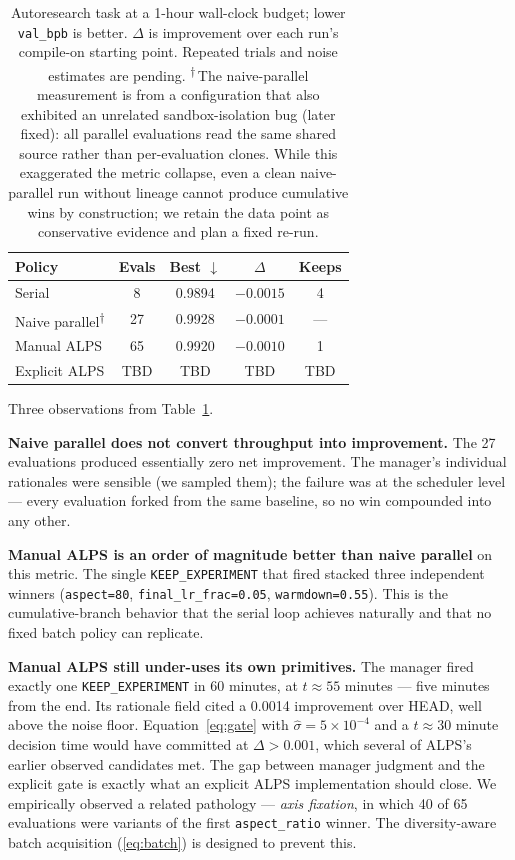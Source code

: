 \documentclass{article}
\newcommand{\alps}{ALPS\xspace}
\newcommand{\keep}{\texttt{KEEP\_EXPERIMENT}\xspace}
\newcommand{\tbd}{\textcolor{red!70!black}{TBD}}
\newcommand{\lowerbetter}{$\downarrow$}
\begin{document}
\begin{table}[t]
\centering
\small
\begin{tabular}{lcccc}
\toprule
Policy & Evals & Best \lowerbetter & $\Delta$ & Keeps \\
\midrule
Serial & 8 & 0.9894 & $-0.0015$ & 4 \\
Naive parallel\textsuperscript{$\dagger$} & 27 & 0.9928 & $-0.0001$ & --- \\
Manual \alps & 65 & 0.9920 & $-0.0010$ & 1 \\
Explicit \alps & \tbd & \tbd & \tbd & \tbd \\
\bottomrule
\end{tabular}
\caption{Autoresearch task at a 1-hour wall-clock budget; lower \texttt{val\_bpb} is better. $\Delta$ is improvement over each run's compile-on starting point. Repeated trials and noise estimates are pending. \textsuperscript{$\dagger$}\,The naive-parallel measurement is from a configuration that also exhibited an unrelated sandbox-isolation bug (later fixed): all parallel evaluations read the same shared source rather than per-evaluation clones. While this exaggerated the metric collapse, even a clean naive-parallel run without lineage cannot produce cumulative wins by construction; we retain the data point as conservative evidence and plan a fixed re-run.}
\label{tab:auto}
\end{table}

Three observations from Table~\ref{tab:auto}.

\textbf{Naive parallel does not convert throughput into improvement.} The 27 evaluations produced essentially zero net improvement. The manager's individual rationales were sensible (we sampled them); the failure was at the scheduler level — every evaluation forked from the same baseline, so no win compounded into any other.

\textbf{Manual \alps is an order of magnitude better than naive parallel} on this metric. The single \keep that fired stacked three independent winners (\texttt{aspect=80}, \texttt{final\_lr\_frac=0.05}, \texttt{warmdown=0.55}). This is the cumulative-branch behavior that the serial loop achieves naturally and that no fixed batch policy can replicate.

\textbf{Manual \alps still under-uses its own primitives.} The manager fired exactly one \keep in 60 minutes, at $t \approx 55$ minutes — five minutes from the end. Its rationale field cited a 0.0014 improvement over HEAD, well above the noise floor. Equation~\ref{eq:gate} with $\hat\sigma = 5\!\times\!10^{-4}$ and a $t \approx 30$ minute decision time would have committed at $\Delta > 0.001$, which several of \alps's earlier observed candidates met. The gap between manager judgment and the explicit gate is exactly what an explicit \alps implementation should close. We empirically observed a related pathology — \emph{axis fixation}, in which 40 of 65 evaluations were variants of the first \texttt{aspect\_ratio} winner. The diversity-aware batch acquisition (\ref{eq:batch}) is designed to prevent this.
\end{document}
